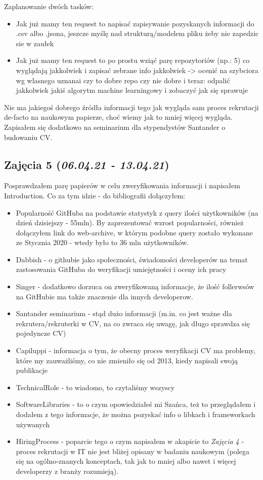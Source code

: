 \documentclass[graybox]{svmult}
\begin{document}
Zaplanowanie dwóch tasków:
\begin{itemize}
  \item Jak już mamy ten request to napisać zapisywanie pozyskanych informacji do .csv albo .jsona, jeszcze myślę nad strukturą/modelem pliku żeby nie zapedzic sie w zaułek
  \item Jak już mamy ten request to po prostu wziąć parę repozytoriów (np.: 5) co wyglądają jakkolwiek i zapisać zebrane info jakkolwiek -> ocenić na szybciora wg wlasnego uznanai czy to dobre repo czy nie dobre i teraz: odpalić jakkolwiek jakiś algorytm machine learningowy i zobaczyć jak się sprawuje
\end{itemize}
Nie ma jakiegoś dobrego źródła informacji tego jak wygląda sam proces rekrutacji de-facto na naukowym papierze, choć wiemy jak to mniej więcej wygląda. Zapisałem się dodatkowo na seminarium dla stypendystów Santander o budowaniu CV.

\subsection{Zajęcia 5 (\emph{06.04.21 - 13.04.21})}
Posprawdzałem parę papierów w celu zweryfikowania informacji i napisałem Introduction. Co za tym idzie - do bibliografii dołączyłem:
\begin{itemize}
  \item Popularność GitHuba na podstawie statystyk z query ilości użytkowników (na dzień dzisiejszy - 55mln). By zaprezentować wzrost popularności, również dołączyłem link do web-archive, w którym podobne query zostało wykonane ze Stycznia 2020 - wtedy było to 36 mln użytkowników.
  \item Dabbish - o githubie jako społeczności, świadomości developerów na temat zastosowania GitHuba do weryfikacji umiejętności i oceny ich pracy
  \item Singer - dodatkowo dorzuca on zweryfikowaną informacje, że ilość follerwsów na GitHubie ma także znaczenie dla innych developerow.
  \item Santander seminarium - stąd dużo informacji (m.in. co jest ważne dla rekrutera/rekruterki w CV, na co zwraca się uwagę, jak długo sprawdza się pojedyncze CV)
  \item Capiluppi - informacja o tym, że obecny proces weryfikacji CV ma problemy, które my zauważliśmy, co nie zmieniło się od 2013, kiedy napisali swoją publikacje
  \item TechnicalRole - to wiadomo, to czytaliśmy wszyscy
  \item SoftwareLibraries - to o czym opowiedziałeś mi Szańca, też to przeglądałem i dodałem z tego informacje, że można pozyskać info o libkach i frameworkach używanych
  \item HiringProcess - poparcie tego o czym napisałem w akapicie to \emph{Zajęcia 4} - proces rekrutacji w IT nie jest bliżej opisany w badaniu naukowym (polega się na ogólno-znanych konceptach, tak jak to mniej albo nawet i więcej developerzy z branży rozumieją). 
\end{itemize}
\end{document}
